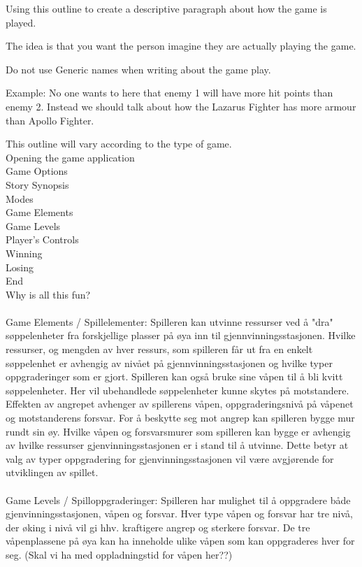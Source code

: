 Using this outline to create a descriptive paragraph about how the game is played. 

The idea is that you want the person imagine they are actually playing the game.

Do not use Generic names when writing about the game play. 

Example: No one wants to here that enemy 1 will have more hit points than enemy 2. Instead we should talk about how the Lazarus Fighter has more armour than Apollo Fighter.

This outline will vary according to the type of game. \\
Opening the game application\\
Game Options \\
Story Synopsis\\
Modes\\
Game Elements\\
Game Levels\\
Player’s Controls\\
Winning\\
Losing\\
End\\
Why is all this fun?\\
\\
Game Elements / Spillelementer: 
Spilleren kan utvinne ressurser ved å "dra" søppelenheter fra forskjellige plasser på øya inn til gjennvinningsstasjonen. Hvilke ressurser, og mengden av hver ressurs, som spilleren får ut fra en enkelt søppelenhet er avhengig av nivået på gjennvinningsstasjonen og hvilke typer oppgraderinger som er gjort. Spilleren kan også bruke sine våpen til å bli kvitt søppelenheter. Her vil ubehandlede søppelenheter kunne skytes på motstandere. Effekten av angrepet avhenger av spillerens våpen, oppgraderingsnivå på våpenet og motstanderens forsvar. For å beskytte seg mot angrep kan spilleren bygge mur rundt sin øy. Hvilke våpen og forsvarsmurer som spilleren kan bygge er avhengig av hvilke ressurser gjenvinningsstasjonen er i stand til å utvinne. Dette betyr at valg av typer oppgradering for gjenvinningsstasjonen vil være avgjørende for utviklingen av spillet.\\
\\
Game Levels / Spilloppgraderinger: 
Spilleren har mulighet til å oppgradere både gjenvinningsstasjonen, våpen og forsvar. Hver type våpen og forsvar har tre nivå, der øking i nivå vil gi hhv. kraftigere angrep og sterkere forsvar. De tre våpenplassene på øya kan ha inneholde ulike våpen som kan oppgraderes hver for seg. (Skal vi ha med oppladningstid for våpen her??)\\
